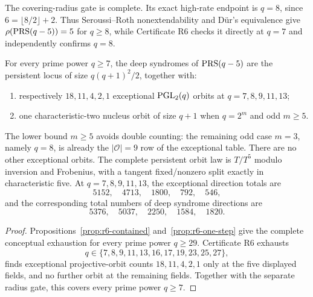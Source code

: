 The covering-radius gate is complete.  Its exact high-rate endpoint is
\(q=8\), since \(6=\lfloor8/2\rfloor+2\).  Thus Seroussi--Roth
nonextendability and Dür's equivalence give
\(\rho(\operatorname{PRS}(q-5))=5\) for \(q\geq8\), while Certificate R6 checks it
directly at \(q=7\) and independently confirms \(q=8\).

\begin{theorem}\label{thm:r6}%
%
%
%
%
%
For every prime power $q\geq7$, the deep syndromes of $\operatorname{PRS}(q-5)$ are
the persistent locus of size $q(q+1)^2/2$, together with:
\begin{enumerate}[label=\textup{(\roman*)}]
\item respectively $18,11,4,2,1$ exceptional $\operatorname{PGL}_2(q)$ orbits at
      $q=7,8,9,11,13$;
\item one characteristic-two nucleus orbit of size $q+1$ when
      $q=2^m$ and odd $m\geq5$.
\end{enumerate}
The lower bound \(m\geq5\) avoids double counting: the remaining odd
case \(m=3\), namely \(q=8\), is already the
\(|\mathcal O|=9\) row of the exceptional table.
There are no other exceptional orbits.  The complete persistent orbit
law is $T/T^5$ modulo inversion and Frobenius, with a tangent
fixed/nonzero split exactly in characteristic five.
At \(q=7,8,9,11,13\), the exceptional direction totals are
\[
                  5152,\quad4713,\quad1800,\quad792,\quad546,
\]
and the corresponding total numbers of deep syndrome directions are
\[
                  5376,\quad5037,\quad2250,\quad1584,\quad1820.
\]
\end{theorem}

\begin{proof}
Propositions~\ref{prop:r6-contained} and~\ref{prop:r6-one-step} give
the complete conceptual exhaustion for every prime power \(q\geq29\).
Certificate R6 exhausts
\[
q\in\{7,8,9,11,13,16,17,19,23,25,27\},
\]
finds exceptional projective-orbit counts $18,11,4,2,1$ only at the
five displayed fields, and no further orbit at the remaining fields.
Together with the separate radius gate, this covers every prime power
$q\geq7$.
\end{proof}

